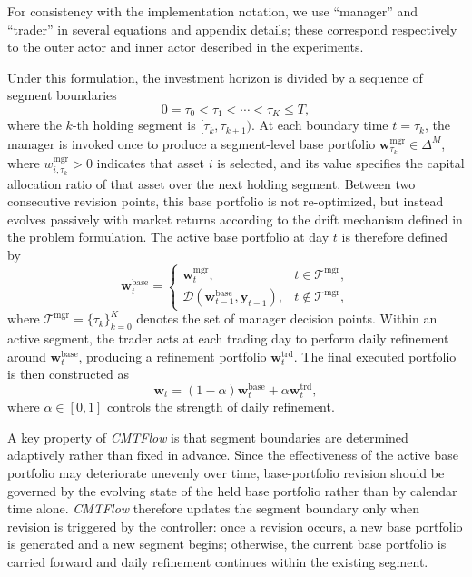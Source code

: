 \documentclass[letterpaper]{article} %
\begin{document}
For consistency with the implementation notation, we use ``manager'' and ``trader'' in several equations and appendix details; these correspond respectively to the outer actor and inner actor described in the experiments.

Under this formulation, the investment horizon is divided by a sequence of segment boundaries
\[
0=\tau_0<\tau_1<\cdots<\tau_K\le T,
\]
where the \(k\)-th holding segment is \([\tau_k,\tau_{k+1})\). At each boundary time \(t=\tau_k\), the manager is invoked once to produce a segment-level base portfolio \(\mathbf{w}_{\tau_k}^{\mathrm{mgr}}\in\Delta^M\), where \(w_{i,\tau_k}^{\mathrm{mgr}}>0\) indicates that asset \(i\) is selected, and its value specifies the capital allocation ratio of that asset over the next holding segment. Between two consecutive revision points, this base portfolio is not re-optimized, but instead evolves passively with market returns according to the drift mechanism defined in the problem formulation. The active base portfolio at day \(t\) is therefore defined by
\[
\mathbf{w}_t^{\mathrm{base}}=
\begin{cases}
\mathbf{w}_t^{\mathrm{mgr}}, & t\in\mathcal{T}^{\mathrm{mgr}},\\[4pt]
\mathcal{D}(\mathbf{w}_{t-1}^{\mathrm{base}},\mathbf{y}_{t-1}), & t\notin\mathcal{T}^{\mathrm{mgr}},
\end{cases}
\]
where \(\mathcal{T}^{\mathrm{mgr}}=\{\tau_k\}_{k=0}^{K}\) denotes the set of manager decision points. Within an active segment, the trader acts at each trading day to perform daily refinement around \(\mathbf{w}_t^{\mathrm{base}}\), producing a refinement portfolio \(\mathbf{w}_t^{\mathrm{trd}}\). The final executed portfolio is then constructed as
\[
\mathbf{w}_t=(1-\alpha)\mathbf{w}_t^{\mathrm{base}}+\alpha\mathbf{w}_t^{\mathrm{trd}},
\]
where \(\alpha\in[0,1]\) controls the strength of daily refinement.

A key property of \textit{CMTFlow} is that segment boundaries are determined adaptively rather than fixed in advance. Since the effectiveness of the active base portfolio may deteriorate unevenly over time, base-portfolio revision should be governed by the evolving state of the held base portfolio rather than by calendar time alone. \textit{CMTFlow} therefore updates the segment boundary only when revision is triggered by the controller: once a revision occurs, a new base portfolio is generated and a new segment begins; otherwise, the current base portfolio is carried forward and daily refinement continues within the existing segment.
\end{document}
